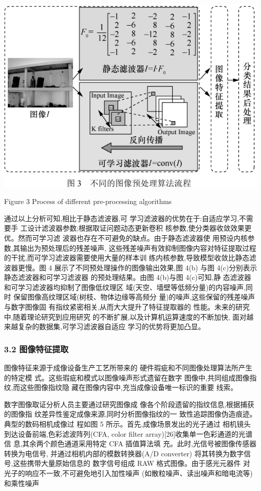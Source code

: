 \documentclass{article}
\begin{document}
\includegraphics{_page_3_Figure_9.png}


Figure 3 Process of different pre-processing algorithms

通过以上分析可知,相比于静态滤波器,可 学习滤波器的优势在于:自适应学习,不需要手 工设计滤波器参数;根据取证问题动态更新卷积 核参数,使分类器收敛效果更优。然而可学习滤 波器也存在不可避免的缺点。由于静态滤波器使 用预设内核参数,其输出为预处理后的残差噪声, 这些残差噪声有效抑制图像内容对特征提取过程 的干扰,而可学习滤波器需要使用大量的样本训 练内核参数,导致模型收敛比静态滤波器更慢。图 4 展示了不同预处理操作的图像输出效果,图 4(b) 与图 4(c)分别表示静态滤波器和可学习滤波器 的预处理结果。由图 4(b)与图 4(c)可知,静 态滤波器和可学习滤波器均抑制了图像低纹理区 域(天空、墙壁等低频分量)的内容噪声,同时 保留图像高纹理区域(树枝、物体边缘等高频分 量)的噪声,这些保留的残差噪声与数字图像固 有指纹紧密相关,从而大大提升了特征提取器的 性能。未来的研究中,随着理论研究到应用研究 的不断扩展,以及计算机运算速度的不断加快, 面对越来越复杂的数据集,可学习滤波器自适应 学习的优势将更加凸显。

\subsubsection{\textbf{3.2} 图像特征提取}

图像特征来源于成像设备生产工艺所带来的 硬件瑕疵和不同图像处理算法所产生的特定模 式。这些瑕疵和模式以图像噪声形式遗留在数字 图像中,共同组成图像指纹,而这些图像指纹隐 藏在图像内容中,充当成像设备唯一标识的重要 线索。

数字图像取证分析人员主要通过研究图像成 像各个阶段遗留的指纹信息,根据捕获的图像指 纹差异性鉴定成像来源,同时分析图像指纹的一 致性追踪图像伪造痕迹。典型的数码相机成像过 程如图 5 所示。首先,成像场景发出的光子通过 相机镜头到达设备前端,色彩滤波阵列(CFA, color filter array)[26]收集单一色彩通道的光谱信 息,其余两个颜色通道采用特定 CFA 插值算法填 充。此时,光信号被图像传感器转换为电信号, 并通过相机内部的模数转换器(A/D converter) 将其转换为数字信号,这些携带大量原始信息的 数字信号组成 RAW 格式图像。由于感光元器件 对光子的响应不一致,不可避免地引入加性噪声 (如散粒噪声、读出噪声和暗电流等)和乘性噪声
\end{document}

